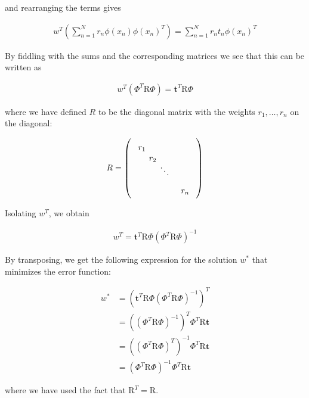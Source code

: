 \documentclass[a4paper]{article}
\begin{document}
and rearranging the terms gives

\begin{align*} %
w^T \left( \sum_{n=1}^{N} r_n \phi(x_n) \phi(x_n)^T \right) = \sum_{n=1}^{N} r_n t_n \phi(x_n)^T
\end{align*}

By fiddling with the sums and the corresponding matrices we see that this can be written as

\begin{align*} %
w^T \left( \Phi^T \mathrm{R} \Phi \right) = \bm{t}^T \mathrm{R} \Phi
\end{align*}

where we have defined $R$ to be the diagonal matrix with the weights $r_1, \dots, r_n$ on the diagonal:

\begin{align*} %
\setlength\unitlength{13pt}
R =
\left(\begin{picture}(6,3)(0,-3)
\put(1,-1){\makebox(0,0){$r_1$}}
\put(2,-2){\makebox(0,0){$r_2$}}
\put(2.8,-2.8){\makebox(0,0){$\cdot$}}
\put(3.1,-3.1){\makebox(0,0){$\cdot$}}
\put(3.4,-3.4){\makebox(0,0){$\cdot$}}
\put(5,-5){\makebox(0,0){$r_n$}}
\end{picture}
\right)
\end{align*}

Isolating $w^T$, we obtain

\begin{align*} %
w^T = \bm{t}^T \mathrm{R} \Phi \left( \Phi^T \mathrm{R} \Phi \right)^{-1}
\end{align*}

By transposing, we get the following expression for the solution $w^*$ that minimizes the error function:

\begin{align*} %
w^* &= \left( \bm{t}^T \mathrm{R} \Phi \left( \Phi^T \mathrm{R} \Phi \right)^{-1} \right) ^T
\\ &= \left( \left( \Phi^T \mathrm{R} \Phi \right)^{-1} \right)^T \Phi^T \mathrm{R} \bm{t}
\\ &= \left( \left( \Phi^T \mathrm{R} \Phi \right)^T \right)^{-1} \Phi^T \mathrm{R} \bm{t}
\\ &= \left( \Phi^T \mathrm{R} \Phi \right)^{-1} \Phi^T \mathrm{R} \bm{t}
\end{align*}

where we have used the fact that $\mathrm{R}^T = \mathrm{R}$.\\
\end{document}
